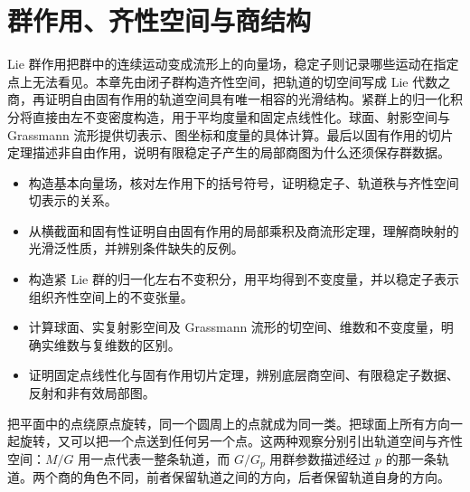 
% 
% 

\chapter{群作用、齐性空间与商结构}
\label{g1:ch:17}

\begin{chapterabstract}
	Lie 群作用把群中的连续运动变成流形上的向量场，稳定子则记录哪些运动在指定点上无法看见。本章先由闭子群构造齐性空间，把轨道的切空间写成 Lie 代数之商，再证明自由固有作用的轨道空间具有唯一相容的光滑结构。紧群上的归一化积分将直接由左不变密度构造，用于平均度量和固定点线性化。球面、射影空间与 Grassmann 流形提供切表示、图坐标和度量的具体计算。最后以固有作用的切片定理描述非自由作用，说明有限稳定子产生的局部商图为什么还须保存群数据。
\end{chapterabstract}

\begin{learninggoals}
	\begin{itemize}
		\item 构造基本向量场，核对左作用下的括号符号，证明稳定子、轨道秩与齐性空间切表示的关系。
		\item 从横截面和固有性证明自由固有作用的局部乘积及商流形定理，理解商映射的光滑泛性质，并辨别条件缺失的反例。
		\item 构造紧 Lie 群的归一化左右不变积分，用平均得到不变度量，并以稳定子表示组织齐性空间上的不变张量。
		\item 计算球面、实复射影空间及 Grassmann 流形的切空间、维数和不变度量，明确实维数与复维数的区别。
		\item 证明固定点线性化与固有作用切片定理，辨别底层商空间、有限稳定子数据、反射和非有效局部图。
	\end{itemize}
\end{learninggoals}

把平面中的点绕原点旋转，同一个圆周上的点就成为同一类。把球面上所有方向一起旋转，又可以把一个点送到任何另一个点。这两种观察分别引出轨道空间与齐性空间：\(M/G\) 用一点代表一整条轨道，而 \(G/G_p\) 用群参数描述经过 \(p\) 的那一条轨道。两个商的角色不同，前者保留轨道之间的方向，后者保留轨道自身的方向。

